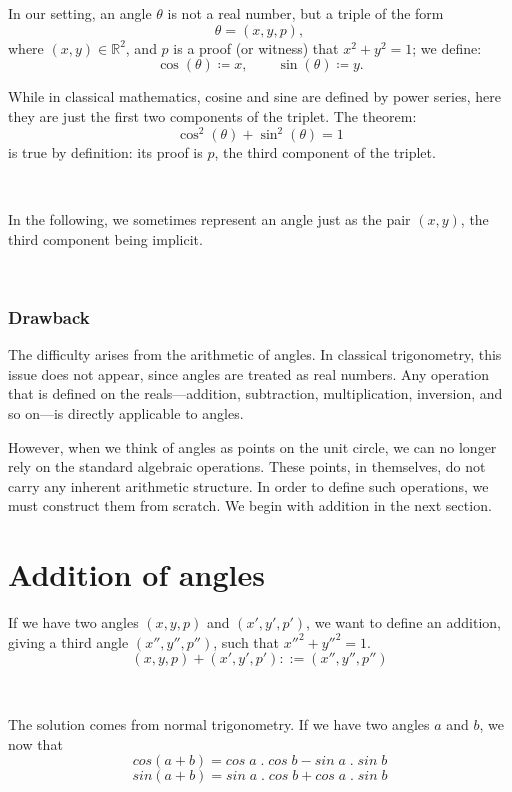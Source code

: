 \documentclass[11pt]{article}
\theoremstyle{definition}
\begin{document}
\

\

\noindent In our setting, an angle \( \theta \) is not a real number,
but a triple of the form
\[
\theta = (x, y, p),
\]
where \( (x, y) \in \mathbb{R}^2 \), and \( p \) is a proof (or
witness) that \( x^2 + y^2 = 1 \); we define:
\[
\cos(\theta) \coloneqq x, \qquad \sin(\theta) \coloneqq y.
\]

\noindent While in classical mathematics, cosine and sine are defined
by power series, here they are just the first two components of the
triplet. The theorem:
\[
\cos^2(\theta) + \sin^2(\theta) = 1
\]
is true by definition: its proof is $p$, the third component of the
triplet.

\

\noindent In the following, we sometimes represent an angle just as
the pair $(x, y)$, the third component being implicit.

\

\subsubsection*{Drawback}

The difficulty arises from the arithmetic of angles. In classical
trigonometry, this issue does not appear, since angles are treated as
real numbers. Any operation that is defined on the reals—addition,
subtraction, multiplication, inversion, and so on—is directly
applicable to angles.

However, when we think of angles as points on the unit circle, we can
no longer rely on the standard algebraic operations. These points, in
themselves, do not carry any inherent arithmetic structure. In order
to define such operations, we must construct them from scratch. We
begin with addition in the next section.

\section{Addition of angles}

If we have two angles $(x, y, p)$ and $(x', y', p')$, we want to
define an addition, giving a third angle $(x'', y'', p'')$, such that
$x''^2+y''^2=1$.
\[
(x, y, p) + (x', y', p') ::= (x'', y'', p'')
\]

\

\noindent The solution comes from normal trigonometry. If we have two
angles $a$ and $b$, we now that
\[
cos(a+b) = cos\;a\;.\;cos\;b - sin\;a\;.\;sin\;b
\]
\[
sin(a+b) = sin\;a\;.\;cos\;b + cos\;a\;.\;sin\;b
\]
\end{document}
